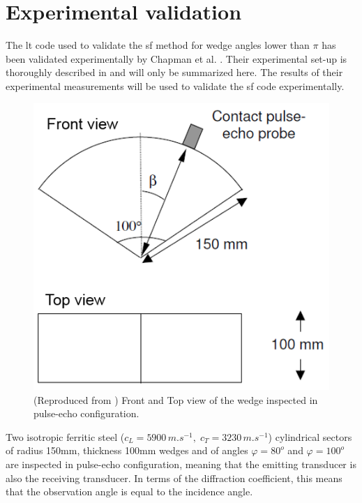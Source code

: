 \section{Experimental validation}
\label{C3:expval}
The \acrshort{lt} code used to validate the \acrshort{sf} method for wedge angles lower than $\pi$ has been validated experimentally by Chapman et al. \cite{ChapmanBurch}. Their experimental set-up is thoroughly described in \cite{ChapmanBurch} and will only be summarized here. The results of their experimental measurements will be used to validate the \acrshort{sf} code experimentally.

\begin{figure}[h!]
\centering
\includegraphics[scale=0.8]{images/chapter3/wedge_schema.png}
\caption{(Reproduced from \cite{ChapmanBurch}) Front and Top view of the wedge inspected in pulse-echo configuration.}
\label{C3:wedge_schema}
\end{figure}

Two isotropic ferritic steel ($c_L=5900\,m.s^{-1}, \; c_T=3230\,m.s^{-1}$) cylindrical sectors of radius 150mm, thickness 100mm wedges and of angles $\varphi=80^o$ and $\varphi=100^o$ are inspected in pulse-echo configuration, meaning that the emitting transducer is also the receiving transducer. In terms of the diffraction coefficient, this means that the observation angle is equal to the incidence angle.

